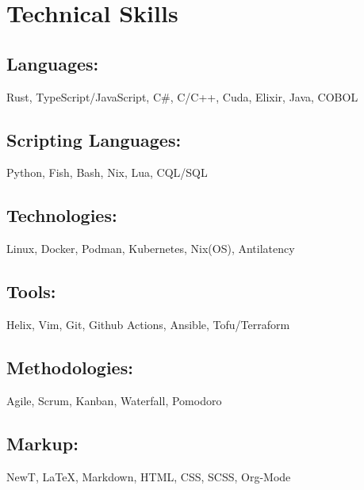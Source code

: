 \section{Technical Skills}

\subsection{Languages:} Rust, TypeScript/JavaScript, C\#, C/C++, Cuda, Elixir, Java, COBOL
\subsection{Scripting Languages:} Python, Fish, Bash, Nix, Lua, CQL/SQL
\subsection{Technologies:} Linux, Docker, Podman, Kubernetes, Nix(OS), Antilatency
\subsection{Tools:} Helix, Vim, Git, Github Actions, Ansible, Tofu/Terraform
\subsection{Methodologies:} Agile, Scrum, Kanban, Waterfall, Pomodoro
\subsection{Markup:} NewT, {\LaTeX}, Markdown, HTML, CSS, SCSS, Org-Mode

